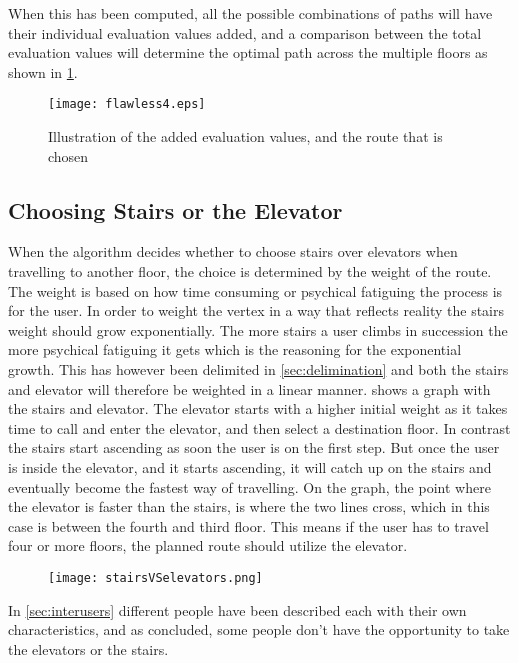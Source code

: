 When this has been computed, all the possible combinations of paths will have their individual evaluation values added, and a comparison between the total evaluation values will determine the optimal path across the multiple floors as shown in \cref{fig:flawless3}.

\begin{figure}[ht!]
    \centering
    \texttt{[image: flawless4.eps]}
    \caption{Illustration of the added evaluation values, and the route that is chosen}
    \label{fig:flawless3}
  \end{figure}


\subsection{Choosing Stairs or the Elevator}

When the algorithm decides whether to choose stairs over elevators when travelling to another floor, the choice is determined by the weight of the route. The weight is based on how time consuming or psychical fatiguing the process is for the user. In order to weight the vertex in a way that reflects reality the stairs weight should grow exponentially. The more stairs a user climbs in succession the more psychical fatiguing it gets which is the reasoning for the exponential growth. This has however been delimited in \cref{sec:delimination} and both the stairs and elevator will therefore be weighted in a linear manner.  shows a graph with the stairs and elevator. The elevator starts with a higher initial weight as it takes time to call and enter the elevator, and then select a destination floor. In contrast the stairs start ascending as soon the user is on the first step. But once the user is inside the elevator, and it starts ascending, it will catch up on the stairs and eventually become the fastest way of travelling. On the graph, the point where the elevator is faster than the stairs, is where the two lines cross, which in this case is between the fourth and third floor. This means if the user has to travel four or more floors, the planned route should utilize the elevator.

\begin{figure}[ht!]
    \centering
    \texttt{[image: stairsVSelevators.png]}
    \caption{}\label{fig:labeled_stairsVSelevators}
  \end{figure}


In \cref{sec:interusers} different people have been described each with their own characteristics, and as concluded, some people don't have the opportunity to take the elevators or the stairs. 

